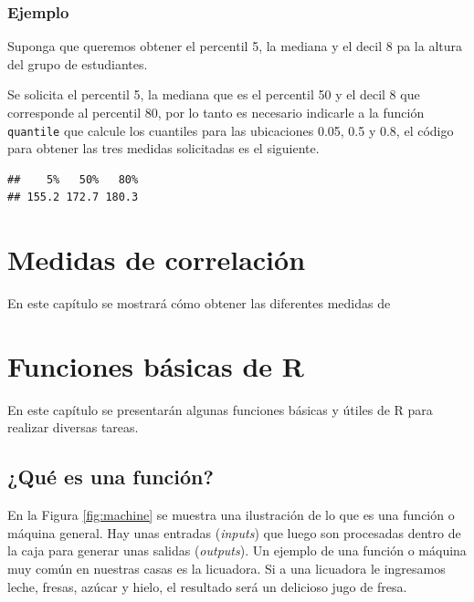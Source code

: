 \documentclass[10pt,]{krantz}
\makeatletter
\newenvironment{Shaded}{\begin{snugshade}}{\end{snugshade}}
\newcommand{\KeywordTok}[1]{\textcolor[rgb]{0.13,0.29,0.53}{\textbf{{#1}}}}
\newcommand{\DataTypeTok}[1]{\textcolor[rgb]{0.13,0.29,0.53}{{#1}}}
\newcommand{\FloatTok}[1]{\textcolor[rgb]{0.00,0.00,0.81}{{#1}}}
\newcommand{\NormalTok}[1]{{#1}}
\let\proglang=\textsf
\newenvironment{kframe}{%
\medskip{}
\setlength{\fboxsep}{.8em}
 \def\at@end@of@kframe{}%
 \ifinner\ifhmode%
  \def\at@end@of@kframe{\end{minipage}}%
  \begin{minipage}{\columnwidth}%
 \fi\fi%
 \def\FrameCommand##1{\hskip\@totalleftmargin \hskip-\fboxsep
 \colorbox{shadecolor}{##1}\hskip-\fboxsep
     \hskip-\linewidth \hskip-\@totalleftmargin \hskip\columnwidth}%
 \MakeFramed {\advance\hsize-\width
   \@totalleftmargin\z@ \linewidth\hsize
   \@setminipage}}%
 {\par\unskip\endMakeFramed%
 \at@end@of@kframe}
\renewenvironment{Shaded}{\begin{kframe}}{\end{kframe}}
\makeatother
\begin{document}
\subsection*{Ejemplo}\label{ejemplo-12}


Suponga que queremos obtener el percentil 5, la mediana y el decil 8 pa
la altura del grupo de estudiantes.

Se solicita el percentil 5, la mediana que es el percentil 50 y el decil
8 que corresponde al percentil 80, por lo tanto es necesario indicarle a
la función \texttt{quantile} que calcule los cuantiles para las
ubicaciones 0.05, 0.5 y 0.8, el código para obtener las tres medidas
solicitadas es el siguiente.

\begin{Shaded}
\end{Shaded}

\begin{verbatim}
##    5%   50%   80% 
## 155.2 172.7 180.3
\end{verbatim}

\chapter{\texorpdfstring{Medidas de correlación
\label{correl}}{Medidas de correlación }}\label{medidas-de-correlacion}

En este capítulo se mostrará cómo obtener las diferentes medidas de

\chapter{Funciones básicas de R}\label{funciones-basicas-de-r}

En este capítulo se presentarán algunas funciones básicas y útiles de
\proglang{R} para realizar diversas tareas.

\section{¿Qué es una función?}\label{que-es-una-funcion}

En la Figura \ref{fig:machine} se muestra una ilustración de lo que es
una función o máquina general. Hay unas entradas (\emph{inputs}) que
luego son procesadas dentro de la caja para generar unas salidas
(\emph{outputs}). Un ejemplo de una función o máquina muy común en
nuestras casas es la licuadora. Si a una licuadora le ingresamos leche,
fresas, azúcar y hielo, el resultado será un delicioso jugo de fresa.
\end{document}
